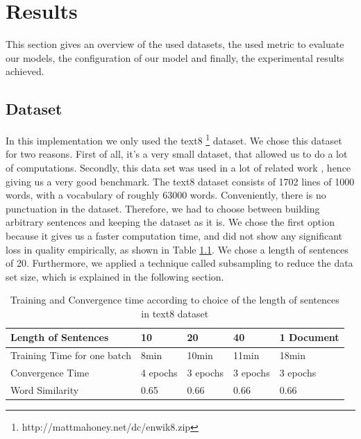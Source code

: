 \chapter{Results}\label{chap:results}


This section gives an overview of the used datasets, the used metric to evaluate our models, the configuration of our model and finally, the experimental results achieved.

\section{Dataset}\label{sec:dataset}
In this implementation we only used the text8 \footnote{http://mattmahoney.net/dc/enwik8.zip} dataset. We chose this dataset for two reasons. First of all, it's a very small dataset, that allowed us to do a lot of computations. Secondly, this data set was used in a lot of related work \cite{gpu}, \cite{cpu} hence giving us a very good benchmark. The text8 dataset consists of 1702 lines of 1000 words, with a vocabulary of roughly 63000 words. Conveniently, there is no punctuation in the dataset. Therefore, we had to choose between building arbitrary sentences and keeping the dataset as it is. We chose the first option because it gives us a faster computation time, and did not show any significant loss in quality empirically, as shown in Table \ref{table:with_20}. We chose a length of sentences of 20. Furthermore, we applied a technique called subsampling to reduce the data set size, which is explained in the following section.

\begin{table}[]
\centering
\begin{tabular}{|l|l|l|l|l|}
\hline
Length of Sentences & 10 & 20 & 40 & 1 Document \\ \hline
Training Time for one batch &8min & 10min & 11min & 18min \\ \hline
Convergence Time &4 epochs & 3 epochs & 3 epochs & 3 epochs \\ \hline
Word Similarity& 0.65 & 0.66 & 0.66 & 0.66 \\ \hline
\end{tabular}
\caption{Training and Convergence time according to choice of the length of sentences in text8 dataset}
\label{table:with_20}
\end{table}

